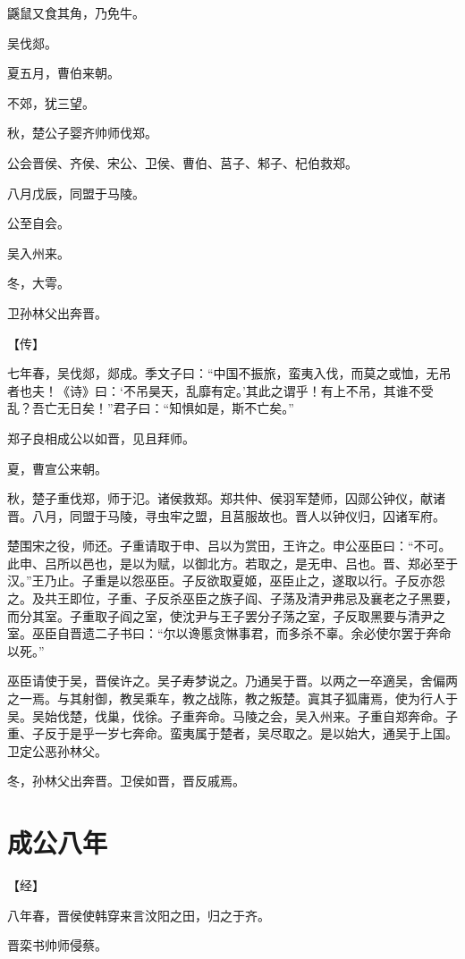 \documentclass[a4paper,12pt,UTF8,twoside]{ctexbook}
\begin{document}
鼷鼠又食其角，乃免牛。

吴伐郯。

夏五月，曹伯来朝。

不郊，犹三望。

秋，楚公子婴齐帅师伐郑。

公会晋侯、齐侯、宋公、卫侯、曹伯、莒子、邾子、杞伯救郑。

八月戊辰，同盟于马陵。

公至自会。

吴入州来。

冬，大雩。

卫孙林父出奔晋。

【传】

七年春，吴伐郯，郯成。季文子曰：“中国不振旅，蛮夷入伐，而莫之或恤，无吊者也夫！《诗》曰：‘不吊昊天，乱靡有定。’其此之谓乎！有上不吊，其谁不受乱？吾亡无日矣！”君子曰：“知惧如是，斯不亡矣。”

郑子良相成公以如晋，见且拜师。

夏，曹宣公来朝。

秋，楚子重伐郑，师于氾。诸侯救郑。郑共仲、侯羽军楚师，囚郧公钟仪，献诸晋。八月，同盟于马陵，寻虫牢之盟，且莒服故也。晋人以钟仪归，囚诸军府。

楚围宋之役，师还。子重请取于申、吕以为赏田，王许之。申公巫臣曰：“不可。此申、吕所以邑也，是以为赋，以御北方。若取之，是无申、吕也。晋、郑必至于汉。”王乃止。子重是以怨巫臣。子反欲取夏姬，巫臣止之，遂取以行。子反亦怨之。及共王即位，子重、子反杀巫臣之族子阎、子荡及清尹弗忌及襄老之子黑要，而分其室。子重取子阎之室，使沈尹与王子罢分子荡之室，子反取黑要与清尹之室。巫臣自晋遗二子书曰：“尔以谗慝贪惏事君，而多杀不辜。余必使尔罢于奔命以死。”

巫臣请使于吴，晋侯许之。吴子寿梦说之。乃通吴于晋。以两之一卒適吴，舍偏两之一焉。与其射御，教吴乘车，教之战陈，教之叛楚。寘其子狐庸焉，使为行人于吴。吴始伐楚，伐巢，伐徐。子重奔命。马陵之会，吴入州来。子重自郑奔命。子重、子反于是乎一岁七奔命。蛮夷属于楚者，吴尽取之。是以始大，通吴于上国。卫定公恶孙林父。

冬，孙林父出奔晋。卫侯如晋，晋反戚焉。


\section{成公八年}



【经】

八年春，晋侯使韩穿来言汶阳之田，归之于齐。

晋栾书帅师侵蔡。
\end{document}
